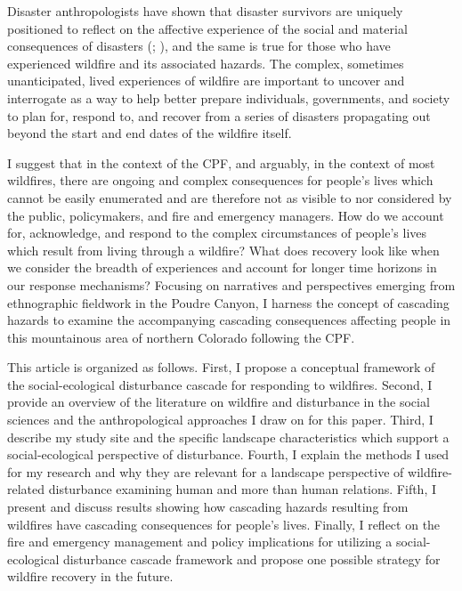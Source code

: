 \documentclass[
]{article}
\begin{document}
Disaster anthropologists have shown that disaster survivors are uniquely positioned to reflect on the affective experience of the social and material consequences of disasters (; ), and the same is true for those who have experienced wildfire and its associated hazards. The complex, sometimes unanticipated, lived experiences of wildfire are important to uncover and interrogate as a way to help better prepare individuals, governments, and society to plan for, respond to, and recover from a series of disasters propagating out beyond the start and end dates of the wildfire itself.

I suggest that in the context of the CPF, and arguably, in the context of most wildfires, there are ongoing and complex consequences for people's lives which cannot be easily enumerated and are therefore not as visible to nor considered by the public, policymakers, and fire and emergency managers. How do we account for, acknowledge, and respond to the complex circumstances of people's lives which result from living through a wildfire? What does recovery look like when we consider the breadth of experiences and account for longer time horizons in our response mechanisms? Focusing on narratives and perspectives emerging from ethnographic fieldwork in the Poudre Canyon, I harness the concept of cascading hazards to examine the accompanying cascading consequences affecting people in this mountainous area of northern Colorado following the CPF.

This article is organized as follows. First, I propose a conceptual framework of the social-ecological disturbance cascade for responding to wildfires. Second, I provide an overview of the literature on wildfire and disturbance in the social sciences and the anthropological approaches I draw on for this paper. Third, I describe my study site and the specific landscape characteristics which support a social-ecological perspective of disturbance. Fourth, I explain the methods I used for my research and why they are relevant for a landscape perspective of wildfire-related disturbance examining human and more than human relations. Fifth, I present and discuss results showing how cascading hazards resulting from wildfires have cascading consequences for people's lives. Finally, I reflect on the fire and emergency management and policy implications for utilizing a social-ecological disturbance cascade framework and propose one possible strategy for wildfire recovery in the future.
\end{document}
